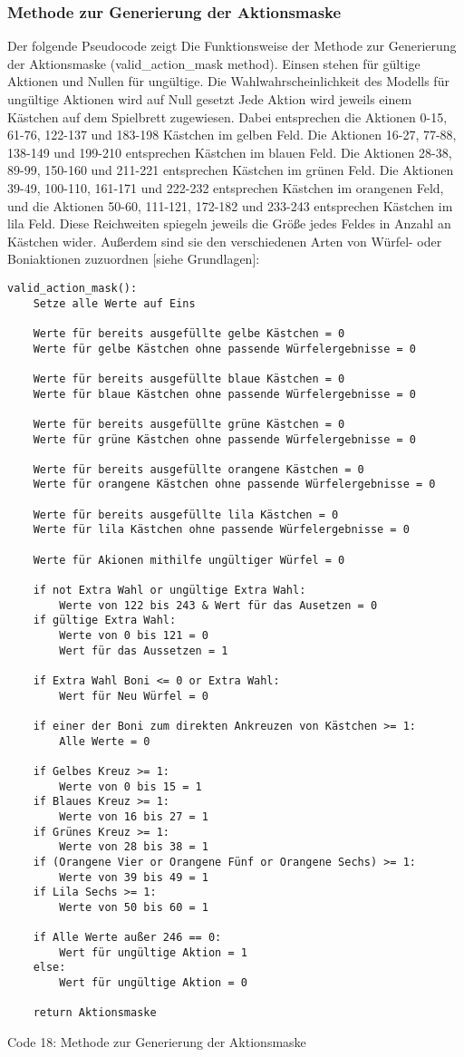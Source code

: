 \subsubsection{Methode zur Generierung der Aktionsmaske}
Der folgende Pseudocode zeigt Die Funktionsweise der Methode zur Generierung der Aktionsmaske (valid\_action\_mask method). Einsen stehen für gültige Aktionen und Nullen für ungültige. Die Wahlwahrscheinlichkeit des Modells für ungültige Aktionen wird auf Null gesetzt Jede Aktion wird jeweils einem Kästchen auf dem Spielbrett zugewiesen. Dabei entsprechen die Aktionen 0-15, 61-76, 122-137 und 183-198 Kästchen im gelben Feld. Die Aktionen 16-27, 77-88, 138-149 und 199-210 entsprechen Kästchen im blauen Feld. Die Aktionen 28-38, 89-99, 150-160 und 211-221 entsprechen Kästchen im grünen Feld. Die Aktionen 39-49, 100-110, 161-171 und 222-232 entsprechen Kästchen im orangenen Feld, und die Aktionen 50-60, 111-121, 172-182 und 233-243 entsprechen Kästchen im lila Feld. Diese Reichweiten spiegeln jeweils die Größe jedes Feldes in Anzahl an Kästchen wider. Außerdem sind sie den verschiedenen Arten von Würfel- oder Boniaktionen zuzuordnen [siehe Grundlagen]:
\vspace{0.5cm}
\begin{lstlisting}
valid_action_mask():
	Setze alle Werte auf Eins
	
	Werte für bereits ausgefüllte gelbe Kästchen = 0
	Werte für gelbe Kästchen ohne passende Würfelergebnisse = 0
	
	Werte für bereits ausgefüllte blaue Kästchen = 0
	Werte für blaue Kästchen ohne passende Würfelergebnisse = 0
	
	Werte für bereits ausgefüllte grüne Kästchen = 0
	Werte für grüne Kästchen ohne passende Würfelergebnisse = 0
	
	Werte für bereits ausgefüllte orangene Kästchen = 0
	Werte für orangene Kästchen ohne passende Würfelergebnisse = 0
	
	Werte für bereits ausgefüllte lila Kästchen = 0
	Werte für lila Kästchen ohne passende Würfelergebnisse = 0
	
	Werte für Akionen mithilfe ungültiger Würfel = 0
	
	if not Extra Wahl or ungültige Extra Wahl:
		Werte von 122 bis 243 & Wert für das Ausetzen = 0
	if gültige Extra Wahl:
		Werte von 0 bis 121 = 0
		Wert für das Aussetzen = 1
	
	if Extra Wahl Boni <= 0 or Extra Wahl:
		Wert für Neu Würfel = 0
	
	if einer der Boni zum direkten Ankreuzen von Kästchen >= 1:
		Alle Werte = 0
	
	if Gelbes Kreuz >= 1:
		Werte von 0 bis 15 = 1
	if Blaues Kreuz >= 1:
		Werte von 16 bis 27 = 1
	if Grünes Kreuz >= 1:
		Werte von 28 bis 38 = 1
	if (Orangene Vier or Orangene Fünf or Orangene Sechs) >= 1:
		Werte von 39 bis 49 = 1
	if Lila Sechs >= 1:
		Werte von 50 bis 60 = 1
	
	if Alle Werte außer 246 == 0:
		Wert für ungültige Aktion = 1
	else:
		Wert für ungültige Aktion = 0
		
	return Aktionsmaske
\end{lstlisting}
Code 18: Methode zur Generierung der Aktionsmaske\\

